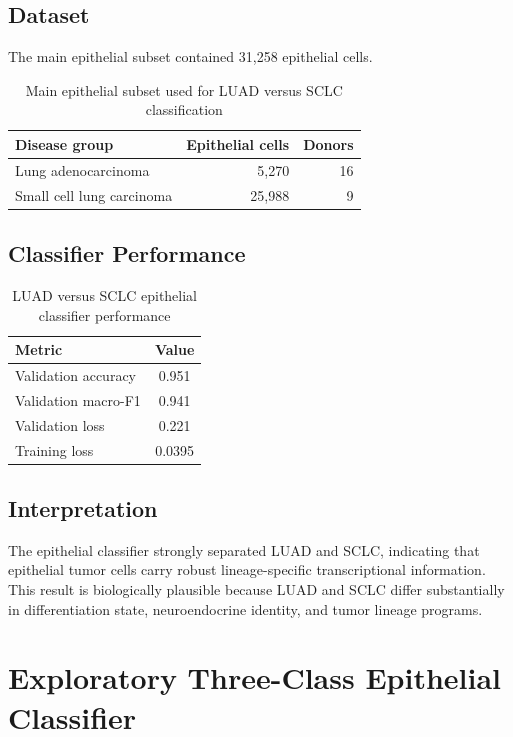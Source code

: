 \documentclass[11pt,a4paper]{article}
\begin{document}
\subsection{Dataset}

The main epithelial subset contained 31,258 epithelial cells.

\begin{table}[htbp]
\centering
\caption{Main epithelial subset used for LUAD versus SCLC classification}
\begin{tabular}{lrr}
\toprule
Disease group & Epithelial cells & Donors \\
\midrule
Lung adenocarcinoma & 5,270 & 16 \\
Small cell lung carcinoma & 25,988 & 9 \\
\bottomrule
\end{tabular}
\end{table}

\subsection{Classifier Performance}

\begin{table}[htbp]
\centering
\caption{LUAD versus SCLC epithelial classifier performance}
\begin{tabular}{lc}
\toprule
Metric & Value \\
\midrule
Validation accuracy & 0.951 \\
Validation macro-F1 & 0.941 \\
Validation loss & 0.221 \\
Training loss & 0.0395 \\
\bottomrule
\end{tabular}
\end{table}

\subsection{Interpretation}

The epithelial classifier strongly separated LUAD and SCLC, indicating that epithelial tumor cells carry robust lineage-specific transcriptional information. This result is biologically plausible because LUAD and SCLC differ substantially in differentiation state, neuroendocrine identity, and tumor lineage programs.

\section{Exploratory Three-Class Epithelial Classifier}
\end{document}
